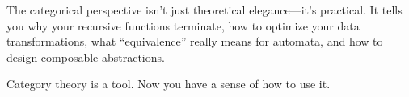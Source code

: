 \documentclass[11pt]{article}
\theoremstyle{definition}
\theoremstyle{plain}
\theoremstyle{remark}
\begin{document}
The categorical perspective isn't just theoretical elegance---it's practical. It tells you why your recursive functions terminate, how to optimize your data transformations, what ``equivalence'' really means for automata, and how to design composable abstractions.

Category theory is a tool. Now you have a sense of how to use it.
\end{document}
